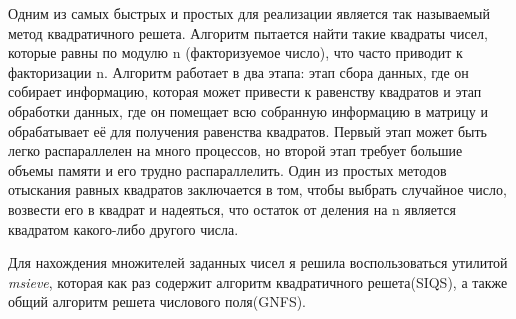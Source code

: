 \documentclass[12pt]{article}
\begin{document}
\par Одним из самых быстрых и простых для реализации является так называемый метод квадратичного решета. Алгоритм пытается найти такие квадраты чисел, которые равны по модулю n (факторизуемое число), что часто приводит к факторизации n. Алгоритм работает в два этапа: этап сбора данных, где он собирает информацию, которая может привести к равенству квадратов и этап обработки данных, где он помещает всю собранную информацию в матрицу и обрабатывает её для получения равенства квадратов. Первый этап может быть легко распараллелен на много процессов, но второй этап требует большие объемы памяти и его трудно распараллелить.
Один из простых методов отыскания равных квадратов заключается в том, чтобы выбрать случайное число, возвести его в квадрат и надеяться, что остаток от деления на n является квадратом какого-либо другого числа.

\par Для нахождения множителей заданных чисел я решила воспользоваться утилитой \textit{msieve}, которая как раз содержит алгоритм квадратичного решета(SIQS), а также общий алгоритм решета числового поля(GNFS).
\end{document}
